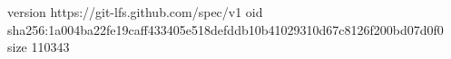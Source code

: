 version https://git-lfs.github.com/spec/v1
oid sha256:1a004ba22fe19caff433405e518defddb10b41029310d67c8126f200bd07d0f0
size 110343
